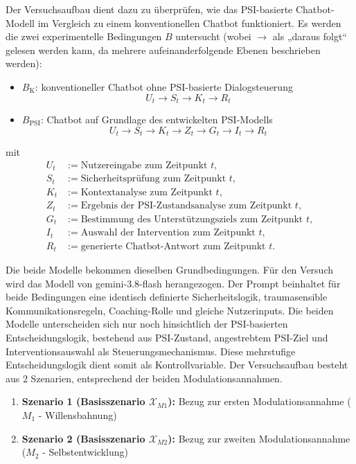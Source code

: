 Der Versuchsaufbau dient dazu zu überprüfen, wie das PSI-basierte Chatbot-Modell im Vergleich zu einem konventionellen Chatbot funktioniert. Es werden die zwei experimentelle Bedingungen $B$ untersucht (wobei $\rightarrow$ als „daraus folgt“ gelesen werden kann, da mehrere aufeinanderfolgende Ebenen beschrieben werden):
\begin{itemize}
    \item $B_{\text{K}}$: konventioneller Chatbot ohne PSI-basierte Dialogsteuerung
    \[U_t 
\rightarrow S_t
\rightarrow K_t
\rightarrow R_t\]
    \item $B_{\text{PSI}}$: Chatbot auf Grundlage des entwickelten PSI-Modells
    \[U_t
\rightarrow S_t
\rightarrow K_t
\rightarrow Z_t
\rightarrow G_t
\rightarrow I_t
\rightarrow R_t
\]
\end{itemize}

mit
\[
\begin{aligned}
U_t &:= \text{Nutzereingabe zum Zeitpunkt } t,\\
S_t &:= \text{Sicherheitsprüfung zum Zeitpunkt } t,\\
K_t &:= \text{Kontextanalyse zum Zeitpunkt } t,\\
Z_t &:= \text{Ergebnis der PSI-Zustandsanalyse zum Zeitpunkt } t,\\
G_t &:= \text{Bestimmung des Unterstützungsziels zum Zeitpunkt } t,\\
I_t &:= \text{Auswahl der Intervention zum Zeitpunkt } t,\\
R_t &:= \text{generierte Chatbot-Antwort zum Zeitpunkt } t.
\end{aligned}
\]

Die beide Modelle bekommen dieselben Grundbedingungen. Für den Versuch wird das Modell von gemini-3.8-flash herangezogen. Der Prompt beinhaltet für beide Bedingungen eine identisch definierte Sicherheitslogik, traumasensible Kommunikationsregeln, Coaching-Rolle und gleiche Nutzerinputs. Die beiden Modelle unterscheiden sich nur noch hinsichtlich der PSI-basierten Entscheidungslogik, bestehend aus PSI-Zustand, angestrebtem PSI-Ziel und Interventionsauswahl als Steuerungsmechanismus. Diese mehrstufige Entscheidungslogik dient somit als Kontrollvariable. 
Der Versuchsaufbau besteht aus 2 Szenarien, entsprechend der beiden Modulationsannahmen. 

\begin{enumerate}
    \item \textbf{Szenario 1 (Basisszenario $\mathcal{X}_{M1}$):} Bezug zur ersten Modulationsannahme ($M_1$ - Willensbahnung)
    \item \textbf{Szenario 2 (Basisszenario $\mathcal{X}_{M2}$):} Bezug zur zweiten Modulationsannahme ($M_2$ - Selbstentwicklung)
\end{enumerate}

